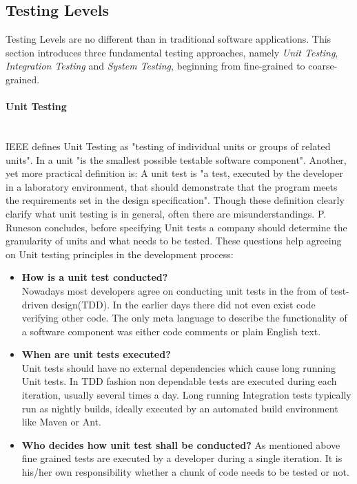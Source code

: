 \documentclass[12pt, notitlepage]{article}
\begin{document}
\subsection{Testing Levels}
Testing Levels are no different than in traditional software applications. 
This section introduces three fundamental testing approaches, namely \textit{Unit Testing}, \textit{Integration Testing} and 
\textit{System Testing}, beginning from fine-grained to coarse-grained. 

\paragraph{Unit Testing} ~\\
IEEE defines Unit Testing\cite{ieee-definition} as "testing of individual units or groups of related units". In \cite{sw-testing-quality-assurance}
a unit "is the smallest possible testable software component". Another, yet more practical definition is\cite{practical-unit-testing-definition}:
A unit test is "a test, executed by the developer in a laboratory environment, that should demonstrate that the program meets the requirements set in the design specification". Though these definition clearly clarify what unit testing is in general, often there are misunderstandings. P. Runeson\cite{unit-testing-survey} concludes,
before specifying Unit tests a company should determine the granularity of units and what needs to be tested.
These questions help agreeing on Unit testing principles in the development process:\\
\begin{itemize}
	\item \textbf{How is a unit test conducted?}\\
	Nowadays most developers agree on conducting unit tests in the from of test-driven design(TDD)\cite{beck-tdd}. 
	In the earlier days there did not even exist code verifying other code. The only meta language to describe the functionality of a software component was either
	code comments or plain English text.
	\item \textbf{When are unit tests executed?}\\
	Unit tests should have no external dependencies which cause long running Unit tests. In TDD fashion non dependable tests are executed during each iteration,
	usually several times a day. Long running Integration tests typically run as nightly builds, ideally executed by an automated build environment like
	Maven\cite{maven} or Ant\cite{ant}.
	\item \textbf{Who decides how unit test shall be conducted?}
	As mentioned above fine grained tests are executed by a developer during a single iteration. It is his/her own responsibility whether a chunk of code needs to
	be tested or not.
\end{itemize}
\end{document}

